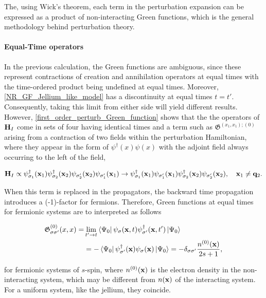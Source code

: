 The, using Wick's theorem, each term in the perturbation expansion can be expressed as a product of non-interacting Green functions, which is the general methodology behind perturbation theory. \\

\paragraph{Equal-Time operators}

In the previous calculation, the Green functions are ambiguous, since these represent contractions of creation and annihilation operators at equal times with the time-ordered product being undefined at equal times. Moreover, \cref{NR_GF_Jellium_like_model} has a discontinuity at equal times $t=t'$. Consequently, taking this limit from either side will yield different results. However, \cref{first_order_perturb_Green_function} shows that the the operators of ${\bf H}_I$ come in sets of four having identical times and a term such as ${\mathfrak{G}^{(x_1, x_1);(0)}}$ arising from a contraction of two fields within the perturbation Hamiltonian, where they appear in the form of $\psi^\dagger(x)\psi(x)$ with the adjoint field always occurring to the left of the field, 

$$
    {\bf H}_I \propto \psi_{\sigma_1}^\dagger ({\bf x}_1) \psi_{\sigma_2}^\dagger ({\bf x}_2) \psi_{\sigma'_2} ({\bf x}_2) \psi_{\sigma'_1} ({\bf x}_1) \rightarrow 
    \psi_{\sigma_1}^\dagger ({\bf x}_1)  \psi_{\sigma'_1} ({\bf x}_1) \psi_{\sigma_2}^\dagger ({\bf x}_2) \psi_{\sigma'_2} ({\bf x}_2), \quad {\bf x}_1 \neq {\bf q}_2.
$$

When this term is replaced in the propagators, the backward time propagation introduces a (-1)-factor for fermions. Therefore, Green functions at equal times for fermionic systems are to interpreted as follows

\begin{equation}
    \begin{split}
        \mathfrak{G}_{\sigma \sigma'}^{(0)}(x,x) =& \lim_{t' \rightarrow t} \bra{\Psi_0} \psi_{\sigma}({\bf x}, t)  \psi^\dagger_{\sigma'}({\bf x}, t') \ket{\Psi_0} \\
        &= - \bra{\Psi_0} \psi^\dagger_{\sigma'}({\bf x}) \psi_{\sigma}({\bf x}) \ket{\Psi_0} = - \delta_{\sigma \sigma'} \frac{n^{(0)}({\bf x)}}{2s+1},
    \end{split}
\end{equation}

for fermionic systems of $s$-spin, where $n^{(0)}({\bf x})$ is the electron density in the non-interacting system, which may be different from $n({\bf x})$ of the interacting system. For a uniform system, like the jellium, they coincide. \\

